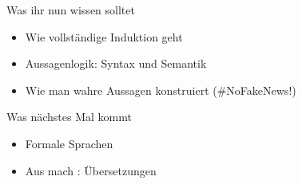 





\begin{frame}	
	\begin{block}{Was ihr nun wissen solltet}
		\begin{itemize}
			\item Wie vollständige Induktion geht
			\item Aussagenlogik: Syntax und Semantik
			\item Wie man wahre Aussagen konstruiert \qquad (\#NoFakeNews!) 
		\end{itemize}
	\end{block}
	
	\begin{block}{Was nächstes Mal kommt}
		\begin{itemize}
			\item Formale Sprachen
			\item Aus  mach : Übersetzungen
		\end{itemize}
	\end{block}
\end{frame}



